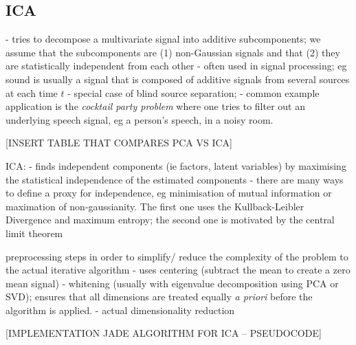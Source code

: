\documentclass[journal, a4paper]{IEEEtran}
\begin{document}

\subsection{ICA}

- tries to decompose a multivariate signal into additive subcomponents;
we assume that the subcomponents are (1) non-Gaussian signals and that (2) they are statistically independent from each other
- often used in signal processing; eg sound is usually a signal that is composed of additive signals from several sources at each time \( t \)
- special case of blind source separation;
- common example application is the \textit{cocktail party problem} where one tries to filter out an underlying speech signal, eg a person's speech, in a noisy room. 


[INSERT TABLE THAT COMPARES PCA VS ICA] 



ICA:
- finds independent components (ie factors, latent variables) by maximising the statistical independence of the estimated components
- there are many ways to define a proxy for independence, eg minimisation of mutual information or maximation of non-gaussianity. The first one uses the Kullback-Leibler Divergence and maximum entropy; the second one is motivated by the central limit theorem %


preprocessing steps in order to simplify/ reduce the complexity of the problem to the actual iterative algorithm
- uses centering (subtract the mean to create a zero mean signal)
- whitening (usually with eigenvalue decomposition using PCA or SVD); ensures that all dimensions are treated equally \textit{a priori} before the algorithm is applied. 
- actual dimensionality reduction 


[IMPLEMENTATION JADE ALGORITHM FOR ICA -- PSEUDOCODE]


\end{document}
